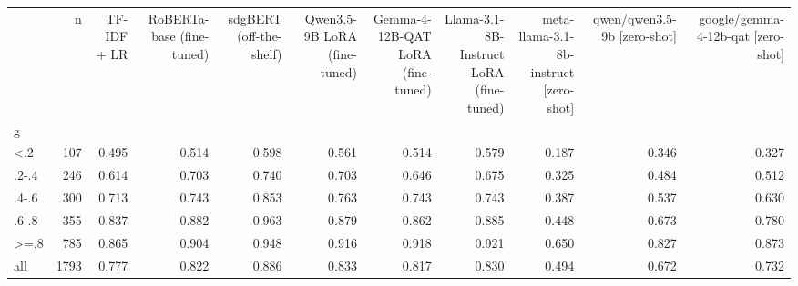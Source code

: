 \begin{tabular}{lrrrrrrrrrr}
\toprule
 & n & TF-IDF + LR & RoBERTa-base (fine-tuned) & sdgBERT (off-the-shelf) & Qwen3.5-9B LoRA (fine-tuned) & Gemma-4-12B-QAT LoRA (fine-tuned) & Llama-3.1-8B-Instruct LoRA (fine-tuned) & meta-llama-3.1-8b-instruct  [zero-shot] & qwen/qwen3.5-9b  [zero-shot] & google/gemma-4-12b-qat  [zero-shot] \\
g &  &  &  &  &  &  &  &  &  &  \\
\midrule
<.2 & 107 & 0.495 & 0.514 & 0.598 & 0.561 & 0.514 & 0.579 & 0.187 & 0.346 & 0.327 \\
.2-.4 & 246 & 0.614 & 0.703 & 0.740 & 0.703 & 0.646 & 0.675 & 0.325 & 0.484 & 0.512 \\
.4-.6 & 300 & 0.713 & 0.743 & 0.853 & 0.763 & 0.743 & 0.743 & 0.387 & 0.537 & 0.630 \\
.6-.8 & 355 & 0.837 & 0.882 & 0.963 & 0.879 & 0.862 & 0.885 & 0.448 & 0.673 & 0.780 \\
>=.8 & 785 & 0.865 & 0.904 & 0.948 & 0.916 & 0.918 & 0.921 & 0.650 & 0.827 & 0.873 \\
all & 1793 & 0.777 & 0.822 & 0.886 & 0.833 & 0.817 & 0.830 & 0.494 & 0.672 & 0.732 \\
\bottomrule
\end{tabular}
